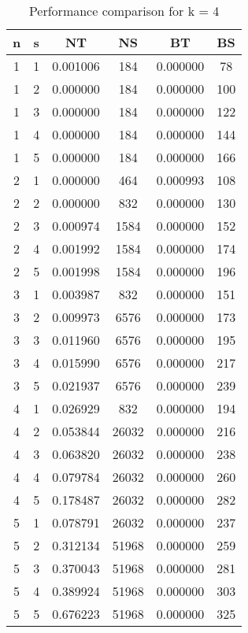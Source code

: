 \documentclass{article}
\begin{document}
    \begin{table}[ht]
    \centering
    \begin{tabular}{|c|c|c|c|c|c|}
    \hline
    n & s & NT & NS & BT & BS \\
    \hline
     1 & 1 & 0.001006 & 184 & 0.000000 & 78 \\ 
 1 & 2 & 0.000000 & 184 & 0.000000 & 100 \\ 
 1 & 3 & 0.000000 & 184 & 0.000000 & 122 \\ 
 1 & 4 & 0.000000 & 184 & 0.000000 & 144 \\ 
 1 & 5 & 0.000000 & 184 & 0.000000 & 166 \\ 
 2 & 1 & 0.000000 & 464 & 0.000993 & 108 \\ 
 2 & 2 & 0.000000 & 832 & 0.000000 & 130 \\ 
 2 & 3 & 0.000974 & 1584 & 0.000000 & 152 \\ 
 2 & 4 & 0.001992 & 1584 & 0.000000 & 174 \\ 
 2 & 5 & 0.001998 & 1584 & 0.000000 & 196 \\ 
 3 & 1 & 0.003987 & 832 & 0.000000 & 151 \\ 
 3 & 2 & 0.009973 & 6576 & 0.000000 & 173 \\ 
 3 & 3 & 0.011960 & 6576 & 0.000000 & 195 \\ 
 3 & 4 & 0.015990 & 6576 & 0.000000 & 217 \\ 
 3 & 5 & 0.021937 & 6576 & 0.000000 & 239 \\ 
 4 & 1 & 0.026929 & 832 & 0.000000 & 194 \\ 
 4 & 2 & 0.053844 & 26032 & 0.000000 & 216 \\ 
 4 & 3 & 0.063820 & 26032 & 0.000000 & 238 \\ 
 4 & 4 & 0.079784 & 26032 & 0.000000 & 260 \\ 
 4 & 5 & 0.178487 & 26032 & 0.000000 & 282 \\ 
 5 & 1 & 0.078791 & 26032 & 0.000000 & 237 \\ 
 5 & 2 & 0.312134 & 51968 & 0.000000 & 259 \\ 
 5 & 3 & 0.370043 & 51968 & 0.000000 & 281 \\ 
 5 & 4 & 0.389924 & 51968 & 0.000000 & 303 \\ 
 5 & 5 & 0.676223 & 51968 & 0.000000 & 325 \\ 

    \hline
    \end{tabular}
    \caption{Performance comparison for k = 4}
    \end{table}
    
\end{document}

